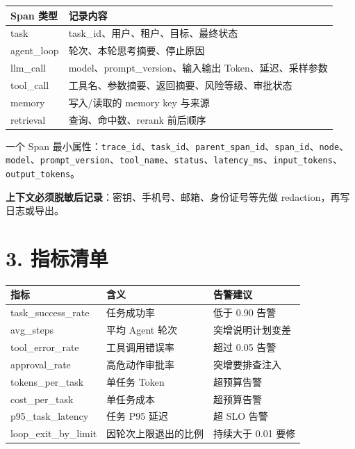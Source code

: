 \documentclass[9pt,a4paper,twocolumn]{ctexart}
\begin{document}
{\footnotesize
\begin{tabular}{|p{}|p{}|}
\hline
\textbf{Span 类型} & \textbf{记录内容} \\
\hline
task & task\_id、用户、租户、目标、最终状态 \\
\hline
agent\_loop & 轮次、本轮思考摘要、停止原因 \\
\hline
llm\_call & model、prompt\_version、输入输出 Token、延迟、采样参数 \\
\hline
tool\_call & 工具名、参数摘要、返回摘要、风险等级、审批状态 \\
\hline
memory & 写入/读取的 memory key 与来源 \\
\hline
retrieval & 查询、命中数、rerank 前后顺序 \\
\hline
\end{tabular}
}



一个 Span 最小属性：\texttt{trace\_id}、\texttt{task\_id}、\texttt{parent\_span\_id}、\texttt{span\_id}、\texttt{node}、\texttt{model}、\texttt{prompt\_version}、\texttt{tool\_name}、\texttt{status}、\texttt{latency\_ms}、\texttt{input\_tokens}、\texttt{output\_tokens}。



\textbf{上下文必须脱敏后记录}：密钥、手机号、邮箱、身份证号等先做 redaction，再写日志或导出。



\section*{3. 指标清单}

{\footnotesize
\begin{tabular}{|p{}|p{}|p{}|}
\hline
\textbf{指标} & \textbf{含义} & \textbf{告警建议} \\
\hline
task\_success\_rate & 任务成功率 & 低于 0.90 告警 \\
\hline
avg\_steps & 平均 Agent 轮次 & 突增说明计划变差 \\
\hline
tool\_error\_rate & 工具调用错误率 & 超过 0.05 告警 \\
\hline
approval\_rate & 高危动作审批率 & 突增要排查注入 \\
\hline
tokens\_per\_task & 单任务 Token & 超预算告警 \\
\hline
cost\_per\_task & 单任务成本 & 超预算告警 \\
\hline
p95\_task\_latency & 任务 P95 延迟 & 超 SLO 告警 \\
\hline
loop\_exit\_by\_limit & 因轮次上限退出的比例 & 持续大于 0.01 要修 \\
\hline
\end{tabular}
}
\end{document}
